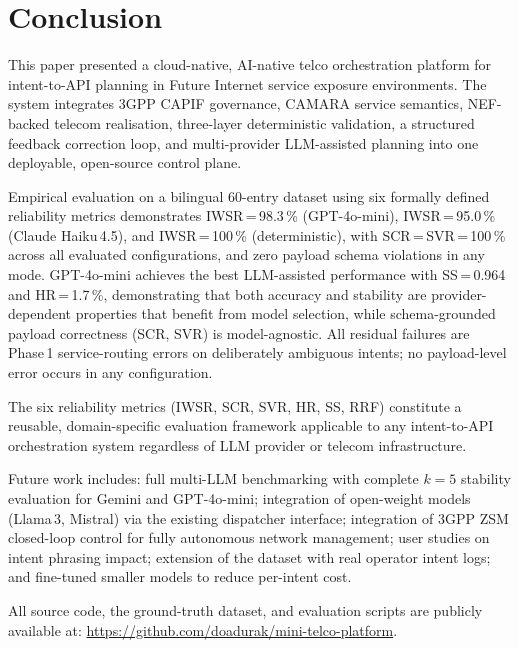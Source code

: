 \documentclass[conference]{IEEEtran}
\begin{document}
\section{Conclusion}
\label{sec:conclusion}

This paper presented a cloud-native, AI-native telco orchestration
platform for intent-to-API planning in Future Internet service exposure
environments.
The system integrates 3GPP CAPIF governance, CAMARA service semantics,
NEF-backed telecom realisation, three-layer deterministic validation,
a structured feedback correction loop, and multi-provider LLM-assisted
planning into one deployable, open-source control plane.

Empirical evaluation on a bilingual 60-entry dataset using six formally
defined reliability metrics demonstrates IWSR\,=\,98.3\,\% (GPT-4o-mini),
IWSR\,=\,95.0\,\% (Claude Haiku\,4.5), and IWSR\,=\,100\,\% (deterministic),
with SCR\,=\,SVR\,=\,100\,\% across all evaluated configurations,
and zero payload schema violations in any mode.
GPT-4o-mini achieves the best LLM-assisted performance with
SS\,=\,0.964 and HR\,=\,1.7\,\%, demonstrating that both accuracy and
stability are provider-dependent properties that benefit from model
selection, while schema-grounded payload correctness (SCR, SVR) is
model-agnostic.
All residual failures are Phase\,1 service-routing errors on deliberately
ambiguous intents; no payload-level error occurs in any configuration.

The six reliability metrics (IWSR, SCR, SVR, HR, SS, RRF) constitute
a reusable, domain-specific evaluation framework applicable to any
intent-to-API orchestration system regardless of LLM provider or
telecom infrastructure.

Future work includes: full multi-LLM benchmarking with complete
$k=5$ stability evaluation for Gemini and GPT-4o-mini;
integration of open-weight models (Llama\,3, Mistral) via the existing
dispatcher interface;
integration of 3GPP ZSM closed-loop control for fully autonomous network
management; user studies on intent phrasing impact; extension of the
dataset with real operator intent logs; and fine-tuned smaller models
to reduce per-intent cost.

All source code, the ground-truth dataset, and evaluation scripts are
publicly available at:
\url{https://github.com/doadurak/mini-telco-platform}.
\end{document}
